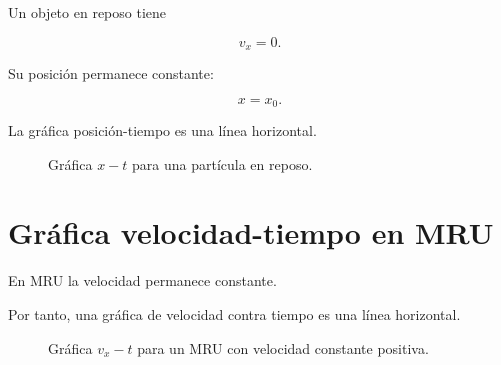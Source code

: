 Un objeto en reposo tiene

\[ v_x=0. \]

Su posición permanece constante:

\[ x=x_0. \]

La gráfica posición-tiempo es una línea horizontal.

\begin{figure}[H]
    \centering


    \caption{Gráfica \(x-t\) para una partícula en reposo.}
\end{figure}


\section{Gráfica velocidad-tiempo en MRU}

En MRU la velocidad permanece constante.

Por tanto, una gráfica de velocidad contra tiempo es una línea horizontal.

\begin{figure}[H]
    \centering


    \caption{Gráfica \(v_x-t\) para un MRU con velocidad constante positiva.}
\end{figure}

